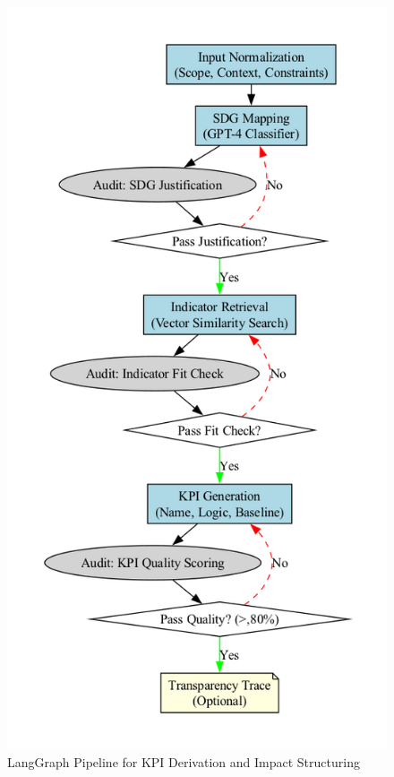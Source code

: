 \begin{figure}[H]
    \centering
    \includegraphics[height=0.9\textheight]{../fig/langgraph_pipeline}
    \caption{LangGraph Pipeline for KPI Derivation and Impact Structuring}
    \label{fig:langgraph-pipeline}
\end{figure}

